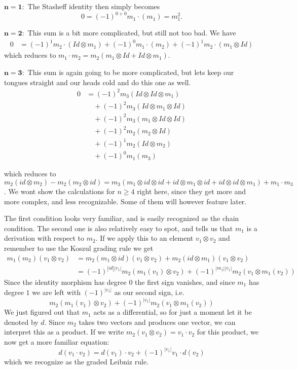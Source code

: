 $\mathbf{n=1 :}$ The Stasheff identity then simply becomes
\begin{equation*}
    0 = (-1)^{0+0}m_1 \cdot (m_1) = m_1^2 .
\end{equation*}

$\mathbf{n=2 :}$ This sum is a bit more complicated, but still not too bad. We have
\begin{align*}
    0 
    &= (-1)^{1}m_2\cdot(Id\otimes m_1)+(-1)^{0}m_1\cdot (m_2)+(-1)^{1}m_2\cdot (m_1\otimes Id)
\end{align*}
which reduces to $m_1 \cdot m_2 = m_2(m_1\otimes Id + Id\otimes m_1)$. 

$\mathbf{n=3 :}$ This sum is again going to be more complicated, but lets keep our tongues straight and our heads cold and do this one as well. 
\begin{align*}
    0 
    &= (-1)^{2}m_3(Id\otimes Id \otimes m_1) \\
    &\quad + (-1)^{2}m_3(Id\otimes m_1 \otimes Id) \\
    &\quad + (-1)^{2}m_3(m_1\otimes Id \otimes Id) \\
    &\quad + (-1)^{2}m_2(m_2\otimes Id) \\
    &\quad + (-1)^{1}m_2(Id\otimes m_2) \\
    &\quad + (-1)^{0}m_1(m_3) 
\end{align*}

which reduces to $m_2(id\otimes m_2) - m_2(m_2\otimes id) = m_3(m_1\otimes id \otimes id + id\otimes m_1 \otimes id + id\otimes id \otimes m_1) + m_1\cdot m_3 $. We wont show the calculations for $n \geq 4$ right here, since they get more and more complex, and less recognizable. Some of them will however feature later.   

The first condition looks very familiar, and is easily recognized as the chain condition. The second one is also relatively easy to spot, and tells us that $m_1$ is a derivation with respect to $m_2$. If we apply this to an element $v_1\otimes v_2$ and remember to use the Koszul grading rule we get 
\begin{align*}
    m_1(m_2)(v_1 \otimes v_2) 
    &= m_2(m_1\otimes id)(v_1\otimes v_2) + m_2(id\otimes m_1)(v_1\otimes v_2) \\
    &= (-1)^{|id||v_1|}m_2(m_1(v_1)\otimes v_2) + (-1)^{|m_1||v_1|}m_2(v_1\otimes m_1(v_2))
\end{align*}
Since the identity morphism has degree $0$ the first sign vanishes, and since $m_1$ has degree $1$ we are left with $(-1)^{|v_1|}$ as our second sign, i.e.
\begin{equation*}
    m_2(m_1(v_1)\otimes v_2) + (-1)^{|v_1|}m_2(v_1\otimes m_1(v_2))
\end{equation*}
We just figured out that $m_1$ acts as a differential, so for just a moment let it be denoted by $d$. Since $m_2$ takes two vectors and produces one vector, we can interpret this as a product. If we write $m_2(v_1\otimes v_2)=v_1\cdot v_2$ for this product, we now get a more familiar equation:
\begin{equation*}
    d(v_1\cdot v_2) = d(v_1)\cdot v_2 + (-1)^{|v_1|}v_1\cdot d(v_2)
\end{equation*}
which we recognize as the graded Leibniz rule. 

